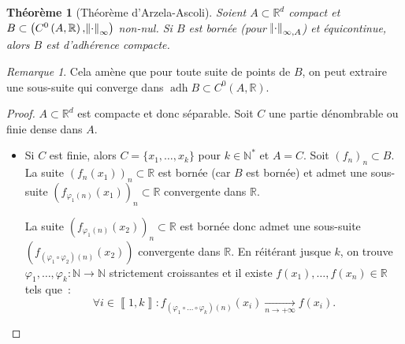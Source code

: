 \documentclass{report}
\newtheorem{thm}{Théorème}[chapter]
\theoremstyle{definition}
\theoremstyle{remark}
\newtheorem*{rmq}{Remarque}
\numberwithin{equation}{section}
\newcommand{\R}{\mathbb R}
\newcommand{\N}{\mathbb N}
\newcommand{\Ns}{\N^{*}}
\DeclareMathOperator{\adh}{adh}
\newcommand{\intint}[2]{\left\llbracket#1, #2\right\rrbracket}
\newcommand{\evfn}[3]{\left(#1\left(#2, #3\right), \norm {\cdot}_{\infty}\right)}
\newcommand{\evnC}[3]{{\evfn {C^{#1}}{#2}{#3}}}
\newcommand{\pinfty}{{+\infty}}
\begin{document}
			\begin{thm}[Théorème d'Arzela-Ascoli]\label{thm:Arzela-Ascoli} Soient $A \subset \R^d$ compact et $B \subset \evnC0A\R$ non-nul. Si $B$ est bornée
			(pour $\norm \cdot_{\infty, A}$) et équicontinue, alors $B$ est d'adhérence compacte.
			\end{thm}

			\begin{rmq} Cela amène que pour toute suite de points de $B$, on peut extraire une sous-suite qui converge dans $\adh B \subset C^0(A, \R)$.
			\end{rmq}

			\begin{proof} $A \subset \R^d$ est compacte et donc séparable. Soit $C$ une partie dénombrable ou finie dense dans $A$.

			\begin{itemize}
				\item Si $C$ est finie, alors $C = \{x_1, \ldots, x_k\}$ pour $k \in \Ns$ et $A = C$. Soit $(f_n)_n \subset B$. La suite $(f_n(x_1))_n \subset \R$
				est bornée (car $B$ est bornée) et admet une sous-suite $(f_{\varphi_1(n)}(x_1))_n \subset \R$ convergente dans $\R$.

				La suite $(f_{\varphi_1(n)}(x_2))_n \subset \R$ est bornée donc admet une sous-suite $(f_{(\varphi_1 \circ \varphi_2)(n)}(x_2))$ convergente
				dans $\R$. En réitérant jusque $k$, on trouve $\varphi_1, \ldots, \varphi_k : \N \to \N$ strictement croissantes et il existe $f(x_1), \ldots,
				f(x_n) \in \R$ tels que~:
				\begin{equation}
					\forall i \in \intint 1k : f_{(\varphi_1 \circ \ldots \circ \varphi_k)(n)}(x_i) \xrightarrow[n \to \pinfty]{} f(x_i).
				\end{equation}


\end{itemize}
\end{proof}
\end{document}
